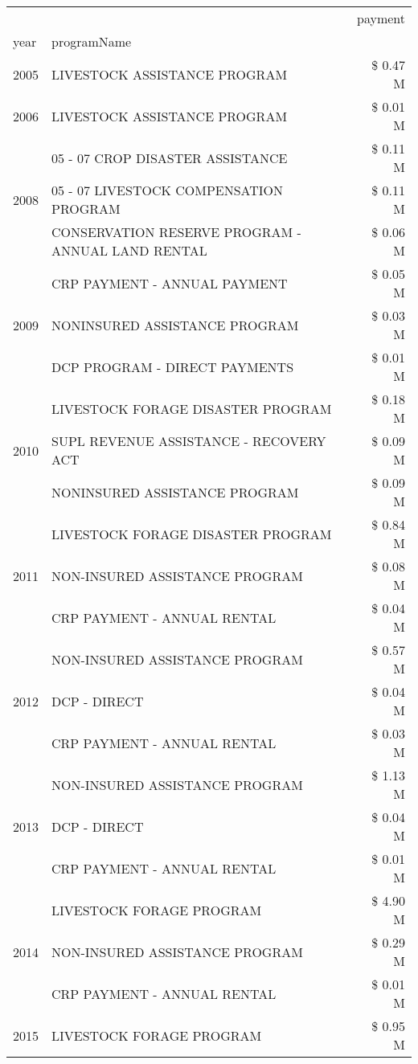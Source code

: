 \begin{tabular}{llr}
\toprule
 &  & payment \\
year & programName &  \\
\midrule
2005 & LIVESTOCK ASSISTANCE PROGRAM & \$ 0.47 M \\
\cline{1-3}
2006 & LIVESTOCK ASSISTANCE PROGRAM & \$ 0.01 M \\
\cline{1-3}
\multirow[t]{3}{*}{2008} & 05 - 07 CROP DISASTER ASSISTANCE & \$ 0.11 M \\
 & 05 - 07 LIVESTOCK COMPENSATION PROGRAM & \$ 0.11 M \\
 & CONSERVATION RESERVE PROGRAM - ANNUAL LAND RENTAL & \$ 0.06 M \\
\cline{1-3}
\multirow[t]{3}{*}{2009} & CRP PAYMENT - ANNUAL PAYMENT & \$ 0.05 M \\
 & NONINSURED ASSISTANCE PROGRAM & \$ 0.03 M \\
 & DCP PROGRAM - DIRECT PAYMENTS & \$ 0.01 M \\
\cline{1-3}
\multirow[t]{3}{*}{2010} & LIVESTOCK FORAGE DISASTER PROGRAM & \$ 0.18 M \\
 & SUPL REVENUE ASSISTANCE - RECOVERY ACT & \$ 0.09 M \\
 & NONINSURED ASSISTANCE PROGRAM & \$ 0.09 M \\
\cline{1-3}
\multirow[t]{3}{*}{2011} & LIVESTOCK FORAGE DISASTER PROGRAM & \$ 0.84 M \\
 & NON-INSURED ASSISTANCE PROGRAM & \$ 0.08 M \\
 & CRP PAYMENT - ANNUAL RENTAL & \$ 0.04 M \\
\cline{1-3}
\multirow[t]{3}{*}{2012} & NON-INSURED ASSISTANCE PROGRAM & \$ 0.57 M \\
 & DCP - DIRECT & \$ 0.04 M \\
 & CRP PAYMENT - ANNUAL RENTAL & \$ 0.03 M \\
\cline{1-3}
\multirow[t]{3}{*}{2013} & NON-INSURED ASSISTANCE PROGRAM & \$ 1.13 M \\
 & DCP - DIRECT & \$ 0.04 M \\
 & CRP PAYMENT - ANNUAL RENTAL & \$ 0.01 M \\
\cline{1-3}
\multirow[t]{3}{*}{2014} & LIVESTOCK FORAGE PROGRAM & \$ 4.90 M \\
 & NON-INSURED ASSISTANCE PROGRAM & \$ 0.29 M \\
 & CRP PAYMENT - ANNUAL RENTAL & \$ 0.01 M \\
\cline{1-3}
\multirow[t]{3}{*}{2015} & LIVESTOCK FORAGE PROGRAM & \$ 0.95 M \\

\end{tabular}
